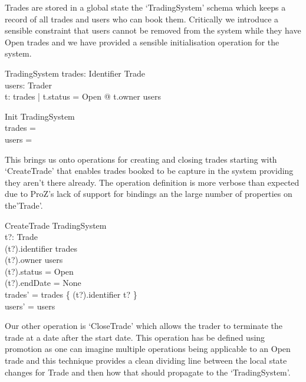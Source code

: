 \documentclass{article}
\begin{document}
\hspace{-0.7cm} Trades are stored in a global state the ‘TradingSystem’ schema which keeps a record of all trades and users who can book them. Critically we introduce a sensible constraint that users cannot be removed from the system while they have Open trades and we have provided a sensible initialisation operation for the system.

\begin{schema}{TradingSystem}
trades: Identifier \pfun Trade \\
users: \power Trader \\
\where
\forall t: \ran trades | t.status = Open @ t.owner \in users \\ 
\end{schema}

\begin{schema}{Init}
TradingSystem \\
\where
trades = \emptyset \\
users = \emptyset \\
\end{schema}

\hspace{-0.7cm} This brings us onto operations for creating and closing trades starting with ‘CreateTrade’ that enables trades booked to be capture in the system providing they aren’t there already. The operation definition is more verbose than expected due to ProZ’s lack of support for bindings an the large number of properties on the’Trade’.

\begin{schema}{CreateTrade}
\Delta TradingSystem \\
t?: Trade \\
\where 
(t?).identifier \notin \dom trades \\
(t?).owner \in users \\
(t?).status = Open \\ 
(t?).endDate = None \\
trades' = trades \cup \{ (t?).identifier \mapsto t? \} \\
users' = users \\
\end{schema}

Our other operation is ‘CloseTrade’ which allows the trader to terminate the trade at a date after the start date. This operation has be defined using promotion as one can imagine multiple operations being applicable to an Open trade and this technique provides a clean dividing line between the local state changes for Trade and then how that should propagate to the ‘TradingSystem’.
\end{document}
